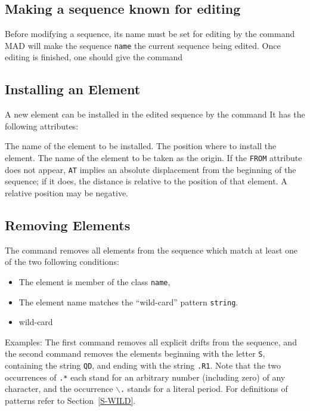\subsection{Making a sequence known for editing}
Before modifying a sequence, its name must be set for editing by
the command
MAD will make the sequence {\tt name} the current sequence being edited.
Once editing is finished, one should give the command
 
\subsection{Installing an Element}
A new element can be installed in the edited sequence by the command
It has the following attributes:
\begin{mylist}
The name of the element to be installed.
The position where to install the element.
The name of the element to be taken as the origin.
If the {\tt FROM} attribute does not appear,
{\tt AT} implies an absolute displacement from the beginning of the sequence;
if it does, the distance is relative to the position of that element.
A relative position may be negative.
\end{mylist}
 
\subsection{Removing Elements}
The command
removes all elements from the sequence which match at least one
of the two following conditions:
\begin{itemize}
\item The element is member of the class {\tt name},
\item The element name matches the ``wild-card'' pattern {\tt string}.
\item{wild-card}
\end{itemize}
Examples:
The first command removes all explicit drifts from the sequence,
and the second command removes the elements beginning with
the letter {\tt S}, containing the string {\tt QD},
and ending with the string {\tt .R1}.
Note that the two occurrences of {\tt .*} each stand for an arbitrary
number (including zero) of any character,
and the occurrence {\tt \(\backslash\).} stands for a literal period.
For definitions of patterns refer to Section~\ref{S-WILD}.
 
